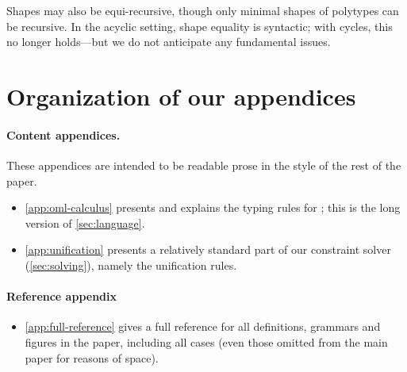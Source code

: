 \documentclass[acmsmall,screen,nonacm,review]{acmart}
\begin{document}
Shapes may also be equi-recursive, though only minimal shapes of polytypes
can be recursive. In the acyclic setting, shape equality is syntactic; with
cycles, this no longer holds---but we do not anticipate any fundamental issues.




\newpage
\appendix

\section*{Organization of our appendices}
\label{app:outline}

\paragraph{Content appendices.} These appendices are intended to be
readable prose in the style of the rest of the paper.

\begin{itemize}
\item \cref{app:oml-calculus} presents and explains the typing rules for \OML;
  this is the long version of \cref{sec:language}.
\item \cref{app:unification} presents a relatively standard part of our constraint solver (\cref{sec:solving}),
  namely the unification rules.
\end{itemize}

\paragraph{Reference appendix}
\begin{itemize}
\item \cref{app:full-reference} gives a full reference for all
  definitions, grammars and figures in the paper, including all cases
  (even those omitted from the main paper for reasons of space).
\end{itemize}
\end{document}
